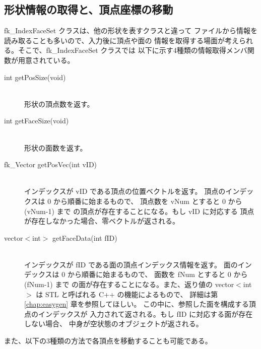 \subsection{形状情報の取得と、頂点座標の移動}
fk\_IndexFaceSet クラスは、他の形状を表すクラスと違って
ファイルから情報を読み取ることも多いので、入力後に頂点や面の
情報を取得する場面が考えられる。そこで、fk\_IndexFaceSet クラスでは
以下に示す4種類の情報取得メンバ関数が用意されている。
\begin{description}
\item[int getPosSize(void)] ~ \\
	形状の頂点数を返す。\\

\item[int getFaceSize(void)] ~ \\
	形状の面数を返す。\\

\item[fk\_Vector getPosVec(int vID)] ~ \\
	インデックスが vID である頂点の位置ベクトルを返す。
	頂点のインデックスは 0 から順番に始まるもので、
	頂点数を vNum とすると 0 から (vNum-1) まで
	の頂点が存在することになる。もし vID に対応する
	頂点が存在しなかった場合、零ベクトルが返される。\\

\item[vector\(<\)int\(>\) getFaceData(int fID)] ~ \\
	インデックスが fID である面の頂点インデックス情報を返す。
	面のインデックスは 0 から順番に始まるもので、
	面数を fNum とすると 0 から (fNum-1) まで
	の面が存在することになる。また、返り値の
	vector\(<\)int\(>\) は STL と呼ばれる C++ の機能によるもので、
	詳細は第 \ref{chap:easygen} 章を参照してほしい。
	この中に、参照した面を構成する頂点のインデックスが
	入力されて返される。もし fID に対応する面が存在しない場合、
	中身が空状態のオブジェクトが返される。\\
\end{description}

また、以下の3種類の方法で各頂点を移動することも可能である。


